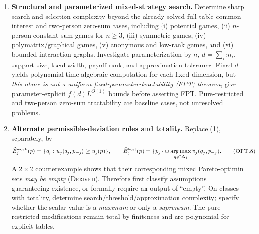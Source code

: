 \documentclass[11pt,a4paper]{article}
\DeclareMathOperator*{\argmax}{arg\,max}
\providecommand{\D}{\Delta}
\begin{document}
\begin{enumerate}[label=\textbf{(\Alph*)},leftmargin=2.8em,itemsep=11pt]
\item \textbf{Structural and parameterized mixed-strategy search.}
Determine sharp search and selection complexity beyond the already-solved full-table common-interest and two-person zero-sum cases, including (i) potential games, (ii) $n$-person constant-sum games for $n\ge3$, (iii) symmetric games, (iv) polymatrix/graphical games, (v) anonymous and low-rank games, and (vi) bounded-interaction graphs. Investigate parameterization by $n$, $d=\sum_i m_i$, support size, local width, payoff rank, and approximation tolerance. Fixed $d$ yields polynomial-time algebraic computation for each fixed dimension, but \emph{this alone is not a uniform fixed-parameter-tractability (FPT) theorem}; give parameter-explicit $f(d)L^{O(1)}$ bounds before asserting FPT. Pure-restricted and two-person zero-sum tractability are baseline cases, not unresolved problems.

\item \textbf{Alternate permissible-deviation rules and totality.}
Replace (1), separately, by
\[
 \widehat B_j^{\rm weak}(p)=\{q_j:u_j(q_j,p_{-j})\ge u_j(p)\},\qquad
 \widehat B_j^{\rm best}(p)=\{p_j\}\cup\argmax_{q_j\in\D_j}u_j(q_j,p_{-j}).
\tag{OPT.8}
\]
A $2\times2$ counterexample shows that their corresponding mixed Pareto-optimin sets \emph{may be empty} (\textsc{Derived}). Therefore first classify assumptions guaranteeing existence, or formally require an output of ``empty''. On classes with totality, determine search/threshold/approximation complexity; specify whether the scalar value is a \emph{maximum} or only a \emph{supremum}. The pure-restricted modifications remain total by finiteness and are polynomial for explicit tables.
\end{enumerate}
\end{document}
